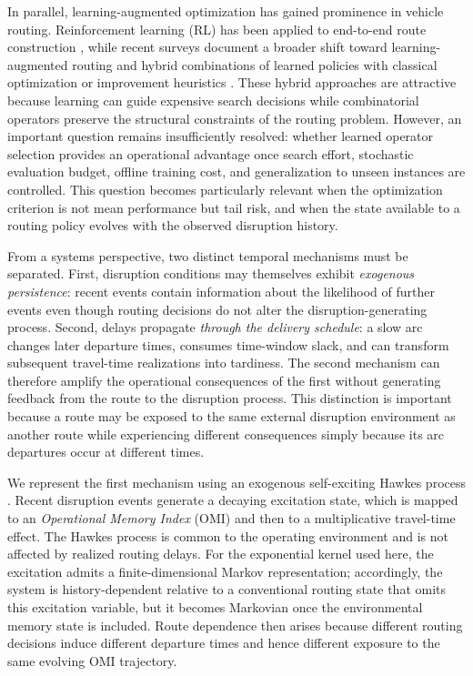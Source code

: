 \documentclass[preprint,12pt]{elsarticle}
\newcommand{\1}{\mathbf{1}}
\begin{document}
In parallel, learning-augmented optimization has gained prominence in vehicle routing.
Reinforcement learning (RL) has been applied to end-to-end route construction
\citep{Nazari2018RL, Kool2019Attention}, while recent surveys document a broader shift toward
learning-augmented routing and hybrid combinations of learned policies with classical
optimization or improvement heuristics
\citep{Bogyrbayeva2024MLVRP, ZhouEtAl2025LearningRouting, WangEtAl2025RLALNS}.
These hybrid approaches are attractive because learning can guide expensive search
decisions while combinatorial operators preserve the structural constraints of the
routing problem.
However, an important question remains insufficiently resolved: whether learned operator
selection provides an operational advantage once search effort, stochastic evaluation
budget, offline training cost, and generalization to unseen instances are controlled.
This question becomes particularly relevant when the optimization criterion is not mean
performance but tail risk, and when the state available to a routing policy evolves with
the observed disruption history.

From a systems perspective, two distinct temporal mechanisms must be separated.
First, disruption conditions may themselves exhibit \emph{exogenous persistence}: recent
events contain information about the likelihood of further events even though routing
decisions do not alter the disruption-generating process.
Second, delays propagate \emph{through the delivery schedule}: a slow arc changes later
departure times, consumes time-window slack, and can transform subsequent travel-time
realizations into tardiness.
The second mechanism can therefore amplify the operational consequences of the first
without generating feedback from the route to the disruption process.
This distinction is important because a route may be exposed to the same external
disruption environment as another route while experiencing different consequences simply
because its arc departures occur at different times.

We represent the first mechanism using an exogenous self-exciting Hawkes process
\citep{hawkes1971, bacry2015hawkes}.
Recent disruption events generate a decaying excitation state, which is mapped to an
\emph{Operational Memory Index} (OMI) and then to a multiplicative travel-time effect.
The Hawkes process is common to the operating environment and is not affected by realized
routing delays.
For the exponential kernel used here, the excitation admits a finite-dimensional Markov
representation; accordingly, the system is history-dependent relative to a conventional
routing state that omits this excitation variable, but it becomes Markovian once the
environmental memory state is included.
Route dependence then arises because different routing decisions induce different
departure times and hence different exposure to the same evolving OMI trajectory.
\end{document}
